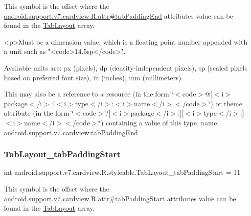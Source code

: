 This symbol is the offset where the \hyperlink{classandroid_1_1support_1_1v7_1_1cardview_1_1R_1_1attr_a0c091ae5857b1f85a1f9bc1be7e4e8e6}{android.\+support.\+v7.\+cardview.\+R.\+attr\#tab\+Padding\+End} attribute\textquotesingle{}s value can be found in the \hyperlink{classandroid_1_1support_1_1v7_1_1cardview_1_1R_1_1styleable_afa0dc9366603eaec9e38d99273ba8512}{Tab\+Layout} array.

\begin{DoxyVerb}      <p>Must be a dimension value, which is a floating point number appended with a unit such as "<code>14.5sp</code>".
\end{DoxyVerb}
 Available units are\+: px (pixels), dp (density-\/independent pixels), sp (scaled pixels based on preferred font size), in (inches), mm (millimeters). 

This may also be a reference to a resource (in the form \char`\"{}$<$code$>$@\mbox{[}$<$i$>$package$<$/i$>$\+:\mbox{]}$<$i$>$type$<$/i$>$\+:$<$i$>$name$<$/i$>$$<$/code$>$\char`\"{}) or theme attribute (in the form \char`\"{}$<$code$>$?\mbox{[}$<$i$>$package$<$/i$>$\+:\mbox{]}\mbox{[}$<$i$>$type$<$/i$>$\+:\mbox{]}$<$i$>$name$<$/i$>$$<$/code$>$\char`\"{}) containing a value of this type.  name android.\+support.\+v7.\+cardview\+:tab\+Padding\+End \mbox{\label{classandroid_1_1support_1_1v7_1_1cardview_1_1R_1_1styleable_ad6c26e7168880fb2f4068b1ae3d08955}} 
\subsubsection{\texorpdfstring{Tab\+Layout\+\_\+tab\+Padding\+Start}{TabLayout\_tabPaddingStart}}
{\footnotesize\ttfamily int android.\+support.\+v7.\+cardview.\+R.\+styleable.\+Tab\+Layout\+\_\+tab\+Padding\+Start = 11\hspace{0.3cm}{\ttfamily [static]}}

This symbol is the offset where the \hyperlink{classandroid_1_1support_1_1v7_1_1cardview_1_1R_1_1attr_a3421bca05bbfb8a54877854aa30829c0}{android.\+support.\+v7.\+cardview.\+R.\+attr\#tab\+Padding\+Start} attribute\textquotesingle{}s value can be found in the \hyperlink{classandroid_1_1support_1_1v7_1_1cardview_1_1R_1_1styleable_afa0dc9366603eaec9e38d99273ba8512}{Tab\+Layout} array.

